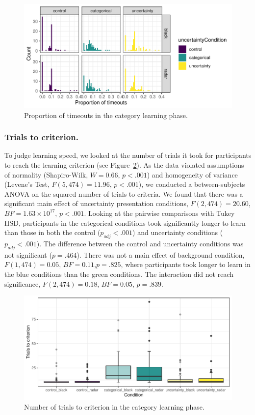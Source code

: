 \documentclass[doc, a4paper, apacite]{apa6}
\begin{document}
\begin{figure}[b!]
	\centering
	\includegraphics{images/DSTL08CLhistogramTimeouts}
	\caption{Proportion of timeouts in the category learning phase.}
	\label{fig:DSTL08CLhistogramTimeouts}
\end{figure}

\subsubsection{Trials to criterion.}
To judge learning speed, we looked at the number of trials it took for participants to reach the learning criterion (see Figure~\ref{fig:DSTL08CLboxplotTrialsCriterion}).
As the data violated assumptions of normality (Shapiro-Wilk, $W=0.66$, $p<.001$) and homogeneity of variance (Levene's Test, $F(5, 474)=11.96$, $p<.001$), we conducted a between-subjects ANOVA on the squared number of trials to criteria. 
We found that there was a significant main effect of uncertainty presentation conditions, $F(2, 474)=20.60$, $BF=1.63 \times 10^{17}$, $p<.001$. 
Looking at the pairwise comparisons with Tukey HSD, participants in the categorical conditions took significantly longer to learn than those in both the control ($p_{adj}<.001$) and uncertainty conditions ($p_{adj}<.001$). 
The difference between the control and uncertainty conditions was not significant ($p=.464$). 
There was not a main effect of background condition, $F(1, 474)=0.05$, $BF=0.11$,$p=.825$, where participants took longer to learn in the blue conditions than the green conditions. 
The interaction did not reach significance, $F(2,474)=0.18$, $BF=0.05$, $p=.839$. 

\begin{figure}[t!]
	\centering
	\includegraphics[width=\textwidth]{images/DSTL08CLboxplotTrialsCriterion}
	\caption{Number of trials to criterion in the category learning phase.}
	\label{fig:DSTL08CLboxplotTrialsCriterion}
\end{figure}
\end{document}
